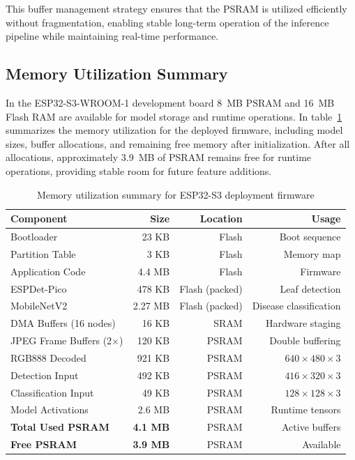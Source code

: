 This buffer management strategy ensures that the PSRAM is utilized efficiently without fragmentation, enabling stable long-term operation of the inference pipeline while maintaining real-time performance.

\subsection{Memory Utilization Summary}
In the ESP32-S3-WROOM-1 development board 8~MB PSRAM and 16~MB Flash RAM are available for model storage and runtime operations. In table~\ref{tab:memory_utilization} summarizes the memory utilization for the deployed firmware, including model sizes, buffer allocations, and remaining free memory after initialization. After all allocations, approximately 3.9~MB of PSRAM remains free for runtime operations, providing  stable room for future feature additions.
\begin{table}
\centering
\small
\begin{tabular}{@{}lrrr@{}}
\toprule
\textbf{Component} & \textbf{Size} & \textbf{Location} & \textbf{Usage} \\
\midrule
Bootloader & 23 KB & Flash & Boot sequence \\
Partition Table & 3 KB & Flash & Memory map \\
Application Code & 4.4 MB & Flash & Firmware \\
\midrule
ESPDet-Pico & 478 KB & Flash (packed) & Leaf detection \\
MobileNetV2 & 2.27 MB & Flash (packed) & Disease classification \\
\midrule
DMA Buffers (16 nodes) & 16 KB & SRAM & Hardware staging \\
JPEG Frame Buffers (2×) & 120 KB & PSRAM & Double buffering \\
RGB888 Decoded & 921 KB & PSRAM & $640\times 480\times 3$ \\
Detection Input & 492 KB & PSRAM & $416\times 320\times 3$ \\
Classification Input & 49 KB & PSRAM & $128\times 128\times 3$ \\
Model Activations & 2.6 MB & PSRAM & Runtime tensors \\
\midrule
\textbf{Total Used PSRAM} & \textbf{4.1 MB} & PSRAM & Active buffers \\
\textbf{Free PSRAM} & \textbf{3.9 MB} & PSRAM & Available \\
\bottomrule
\end{tabular}
\caption{Memory utilization summary for ESP32-S3 deployment firmware}
\label{tab:memory_utilization}
\end{table}


